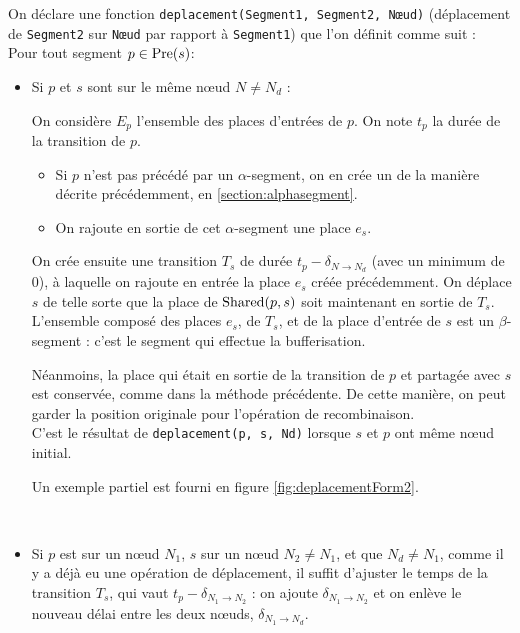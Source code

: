 On déclare une fonction \texttt{deplacement(Segment1, Segment2, Nœud)} (déplacement de \texttt{Segment2} sur \texttt{Nœud} par rapport à \texttt{Segment1}) que l'on définit comme suit :
~ \\
Pour tout segment $p \in \operatorname{Pre}(s)$:
\begin{itemize}
\item {Si $p$ et $s$ sont sur le même nœud $N \neq N_d$ :

On considère $E_{p}$ l'ensemble des places d'entrées de $p$.
On note $t_p$ la durée de la transition de $p$.

\begin{itemize}
\item Si $p$ n'est pas précédé par un $\alpha$-segment, on en crée un de la manière décrite précédemment, en \ref{section:alphasegment}.
\item On rajoute en sortie de cet $\alpha$-segment une place $e_s$.
\end{itemize}
\vspace{1em}

On crée ensuite une transition $T_s$ de durée $t_p - \delta_{N \rightarrow N_d}$ (avec un minimum de 0), à laquelle on rajoute en entrée la place $e_s$ créée précédemment. On déplace $s$ de telle sorte que la place de $\operatorname{Shared}(p, s)$ soit maintenant en sortie de $T_s$.
L'ensemble composé des places $e_s$, de $T_s$, et de la place d'entrée de $s$ est un $\beta$-segment : c'est le segment qui effectue la bufferisation.

Néanmoins, la place qui était en sortie de la transition de $p$ et partagée avec $s$ est conservée, comme dans la méthode précédente. De cette manière, on peut garder la position originale pour l'opération de recombinaison.
~ \\

C'est le résultat de \texttt{deplacement(p, s, Nd)} lorsque $s$ et $p$ ont même nœud initial.

Un exemple partiel est fourni en figure \ref{fig:deplacementForm2}.
}
\\
\item{ Si $p$ est sur un nœud $N_1$, $s$ sur un nœud $N_2 \neq N_1$, et que $N_d \neq N_1$, comme il y a déjà eu une opération de déplacement, il suffit d'ajuster le temps de la transition $T_s$, qui vaut $t_p - \delta_{N_1 \rightarrow N_2}$ : on ajoute $\delta_{N_1 \rightarrow N_2}$ et on enlève le nouveau délai entre les deux nœuds, $\delta_{N_1 \rightarrow N_d}$.

}
\end{itemize}
